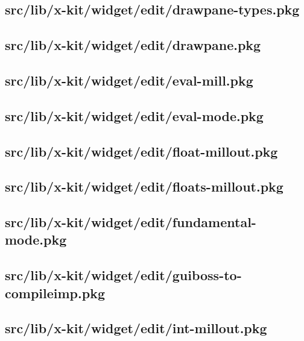 \subsection{src/lib/x-kit/widget/edit/drawpane-types.pkg}


\subsection{src/lib/x-kit/widget/edit/drawpane.pkg}


\subsection{src/lib/x-kit/widget/edit/eval-mill.pkg}


\subsection{src/lib/x-kit/widget/edit/eval-mode.pkg}


\subsection{src/lib/x-kit/widget/edit/float-millout.pkg}


\subsection{src/lib/x-kit/widget/edit/floats-millout.pkg}


\subsection{src/lib/x-kit/widget/edit/fundamental-mode.pkg}


\subsection{src/lib/x-kit/widget/edit/guiboss-to-compileimp.pkg}


\subsection{src/lib/x-kit/widget/edit/int-millout.pkg}


